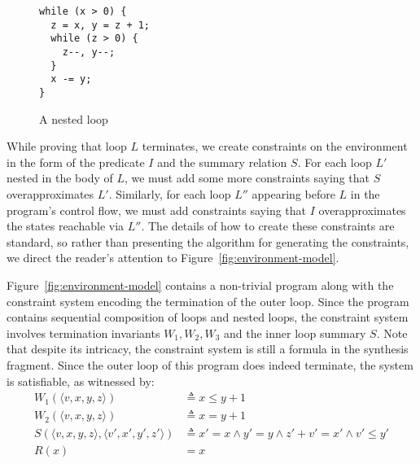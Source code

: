 \documentclass[preprint]{sigplanconf}
\theoremstyle{definition}
\begin{document}
\begin{figure}
\begin{lstlisting}
while (x > 0) {
  z = x, y = z + 1;
  while (z > 0) {
    z--, y--;
  }
  x -= y;
}
\end{lstlisting}
\caption{A nested loop\label{fig:nested}}
\end{figure}

While proving that loop $L$ terminates, we create constraints on the environment in the
form of the predicate $I$ and the summary relation $S$.  For each loop $L'$ nested in the body
of $L$, we must add some more constraints saying that $S$ overapproximates $L'$.
Similarly, for each loop $L''$ appearing before $L$ in the program's control flow, we
must add constraints saying that $I$ overapproximates the states reachable via $L''$.
The details of how to create these constraints are standard, so
rather than presenting the algorithm for generating the constraints, we direct the
reader's attention to Figure~\ref{fig:environment-model}.  


Figure~\ref{fig:environment-model} contains a non-trivial program
along with the constraint system
encoding the termination of the outer loop.  Since the program contains sequential composition
of loops and nested loops, the constraint
system involves termination invariants $W_1, W_2, W_3$ and the inner loop summary $S$.
Note that despite its intricacy, the constraint system is still a formula in the synthesis fragment.
Since the outer loop of this program does indeed terminate, the system is satisfiable, as witnessed by:
\begin{align*}
W_1(\langle v, x, y, z \rangle ) & \triangleq x \leq y + 1 \\
W_2(\langle v, x, y, z \rangle ) & \triangleq x = y + 1 \\
S(\langle v, x, y, z \rangle, \langle v', x', y', z' \rangle) & \triangleq x ' = x \wedge y' = y \wedge z' + v' = x' \wedge v' \leq y' \\
R(x) & = x
\end{align*}
\end{document}
